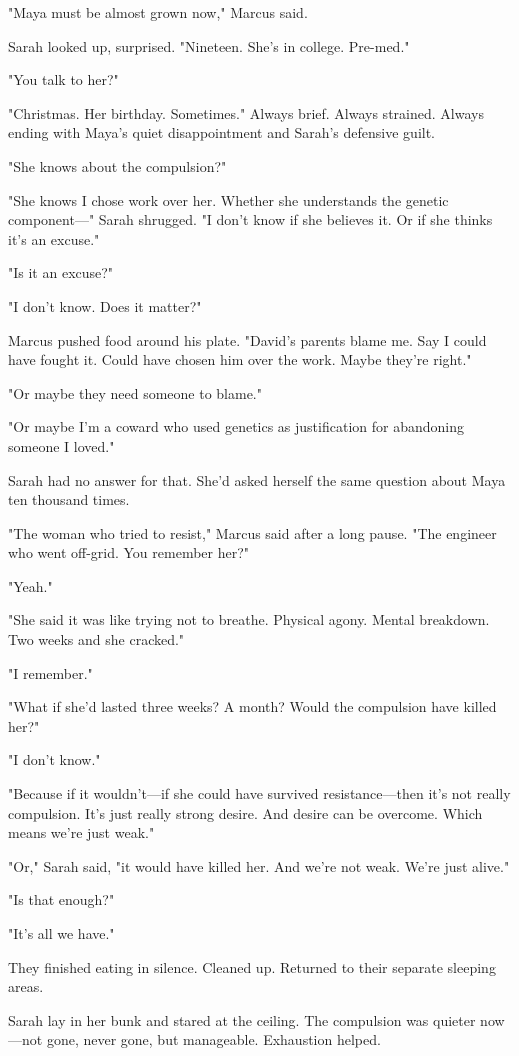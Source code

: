 "Maya must be almost grown now," Marcus said.

Sarah looked up, surprised. "Nineteen. She's in college. Pre-med."

"You talk to her?"

"Christmas. Her birthday. Sometimes." Always brief. Always strained. Always ending with Maya's quiet disappointment and Sarah's defensive guilt.

"She knows about the compulsion?"

"She knows I chose work over her. Whether she understands the genetic component—" Sarah shrugged. "I don't know if she believes it. Or if she thinks it's an excuse."

"Is it an excuse?"

"I don't know. Does it matter?"

Marcus pushed food around his plate. "David's parents blame me. Say I could have fought it. Could have chosen him over the work. Maybe they're right."

"Or maybe they need someone to blame."

"Or maybe I'm a coward who used genetics as justification for abandoning someone I loved."

Sarah had no answer for that. She'd asked herself the same question about Maya ten thousand times.

"The woman who tried to resist," Marcus said after a long pause. "The engineer who went off-grid. You remember her?"

"Yeah."

"She said it was like trying not to breathe. Physical agony. Mental breakdown. Two weeks and she cracked."

"I remember."

"What if she'd lasted three weeks? A month? Would the compulsion have killed her?"

"I don't know."

"Because if it wouldn't—if she could have survived resistance—then it's not really compulsion. It's just really strong desire. And desire can be overcome. Which means we're just weak."

"Or," Sarah said, "it would have killed her. And we're not weak. We're just alive."

"Is that enough?"

"It's all we have."

They finished eating in silence. Cleaned up. Returned to their separate sleeping areas.

Sarah lay in her bunk and stared at the ceiling. The compulsion was quieter now—not gone, never gone, but manageable. Exhaustion helped.

